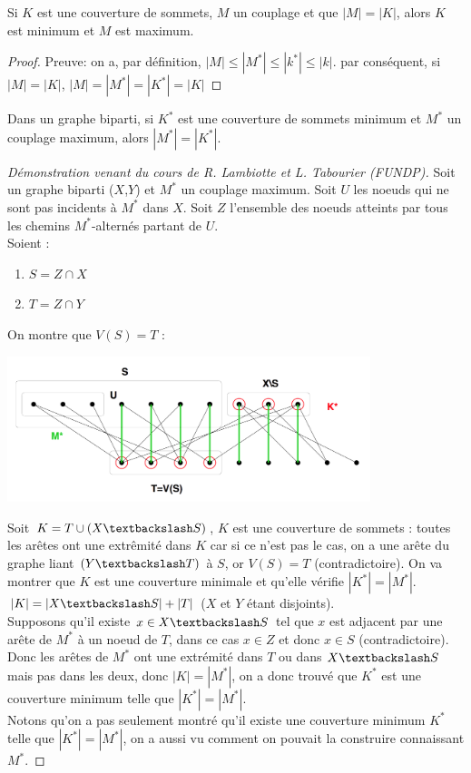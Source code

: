 \begin{mylem}
  Si $K$ est une couverture de sommets, $M$ un couplage et que $|M| = |K|$, alors $K$ est minimum et $M$ est maximum.
  \begin{proof}
     Preuve: on a, par définition, $|M| \leq |M^*| \leq |k^*| \leq |k|$. par conséquent, si $|M| = |K|$, $|M| = |M^*| = |K^*| = |K|$
  \end{proof}
\end{mylem}

\begin{mytheo} [König]
  Dans un graphe biparti, si $K^*$ est une couverture de sommets minimum et $M^*$ un couplage maximum, alors $|M^*| = |K^*|$.
  \begin{proof} [Démonstration venant du cours de R. Lambiotte et L. Tabourier  (FUNDP)]
    Soit un graphe biparti ($X$,$Y$) et $M^*$ un couplage maximum. 
    Soit $U$ les noeuds qui ne sont pas incidents à $M^*$ dans $X$.
    Soit $Z$ l'ensemble des noeuds atteints par tous les chemins $M^*$-alternés partant de $U$.\\
    Soient : 
    \begin{enumerate}
      \item $S = Z \cap X$
      \item $T = Z \cap Y$
    \end{enumerate}
    On montre que $V(S) = T$ :
    \begin{center}
      \includegraphics[width=300pt]{../img/konig}
    \end{center}
    Soit $K = T \cup (X \textbackslash S)$, $K$ est une couverture de sommets : toutes les arêtes ont une extrêmité dans $K$ car si ce n'est pas le cas, on a une arête du graphe liant $(Y \textbackslash T)$ à $S$, or $V(S) = T$ (contradictoire). On va montrer que $K$ est une couverture minimale et qu'elle vérifie $|K^*| = |M^*|$.\\
    $|K| = |X \textbackslash S| + |T|$ ($X$ et $Y$ étant disjoints).\\
    Supposons qu'il existe $x \in X \textbackslash S$ tel que $x$ est adjacent par une arête de $M^*$ à un noeud de $T$, dans ce cas $x \in Z$ et donc $x \in S$ (contradictoire). Donc les arêtes de $M^*$ ont une extrémité dans $T$ ou dans $X \textbackslash S$ mais pas dans les deux, donc $|K| = |M^*|$, on a donc trouvé que $K^*$ est une couverture minimum telle que $|K^*| = |M^*|$.\\
    Notons qu'on a pas seulement montré qu'il existe une couverture minimum $K^*$ telle que $|K^*| = |M^*|$, on a aussi vu comment on pouvait la construire connaissant $M^*$.
  \end{proof}
\end{mytheo}

